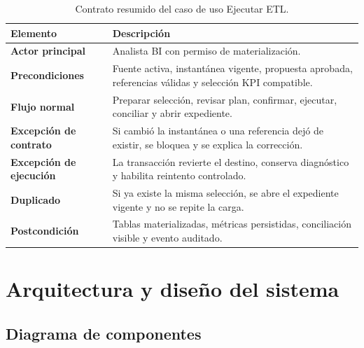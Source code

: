 \documentclass[11pt,letterpaper]{article}
\begin{document}
\begin{table}[ht]
\centering
\caption{Contrato resumido del caso de uso Ejecutar ETL.}
\begin{tabularx}{\textwidth}{@{}>{\bfseries}p{}X@{}}
  \toprule
  Elemento & Descripción \\
  \midrule
  Actor principal & Analista BI con permiso de materialización. \\
  Precondiciones & Fuente activa, instantánea vigente, propuesta aprobada, referencias válidas y selección KPI compatible. \\
  Flujo normal & Preparar selección, revisar plan, confirmar, ejecutar, conciliar y abrir expediente. \\
  Excepción de contrato & Si cambió la instantánea o una referencia dejó de existir, se bloquea y se explica la corrección. \\
  Excepción de ejecución & La transacción revierte el destino, conserva diagnóstico y habilita reintento controlado. \\
  Duplicado & Si ya existe la misma selección, se abre el expediente vigente y no se repite la carga. \\
  Postcondición & Tablas materializadas, métricas persistidas, conciliación visible y evento auditado. \\
  \bottomrule
\end{tabularx}
\end{table}

\section{Arquitectura y diseño del sistema}

\subsection{Diagrama de componentes}
\end{document}
